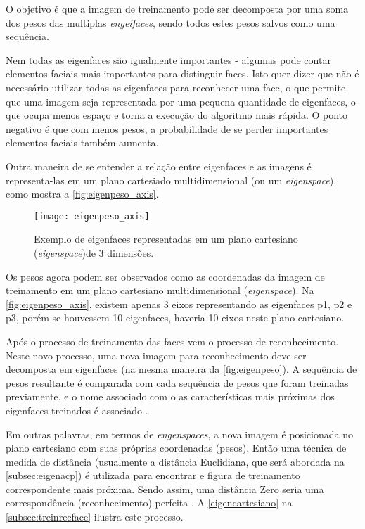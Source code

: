 O objetivo é que a imagem de treinamento pode ser decomposta por uma soma dos pesos das multiplas \textit{engeifaces}, sendo todos estes pesos salvos como uma sequência.

Nem todas as eigenfaces são igualmente importantes - algumas pode contar elementos faciais mais importantes para distinguir faces. Isto quer dizer que não é necessário utilizar todas as eigenfaces para reconhecer uma face, o que permite que uma imagem seja representada por uma pequena quantidade de eigenfaces, o que ocupa menos espaço e torna a execução do algoritmo mais rápida. O ponto negativo é que com menos pesos, a probabilidade de se perder importantes elementos faciais também aumenta\cite{drmathew_java_programming}.

Outra maneira de se entender a relação entre eigenfaces e as imagens é representa-las em um plano cartesiado multidimensional (ou um \textit{eigenspace}), como mostra a \autoref{fig:eigenpeso_axis}.

\begin{figure}[h]
	\centering
	\texttt{[image: eigenpeso\_axis]}
	\caption{Exemplo de eigenfaces representadas em um plano cartesiano (\textit{eigenspace})de 3 dimensões. }
	\label{fig:eigenpeso_axis}
\end{figure}

Os pesos agora podem ser observados como as coordenadas da imagem de treinamento em um plano cartesiano multidimensional (\textit{eigenspace}). Na \autoref{fig:eigenpeso_axis}, existem apenas 3 eixos representando as eigenfaces p1, p2 e p3, porém se houvessem 10 eigenfaces, haveria 10 eixos neste plano cartesiano.

Após o processo de treinamento das faces vem o processo de reconhecimento. Neste novo processo, uma nova imagem para reconhecimento deve ser decomposta em eigenfaces (na mesma maneira da \autoref{fig:eigenpeso}). A sequência de pesos resultante é comparada com cada sequência de pesos que foram treinadas previamente, e o nome associado com o as características mais próximas dos eigenfaces treinados é associado \cite{drmathew_java_programming}.

Em outras palavras, em termos de \textit{engenspaces}, a nova imagem é posicionada no plano cartesiano com suas próprias coordenadas (pesos). Então uma técnica de medida de distância (usualmente a distância Euclidiana, que será abordada na \autoref{subsec:eigenacp}) é utilizada para encontrar e figura de treinamento correspondente mais próxima. Sendo assim, uma distância Zero seria uma correspondência (reconhecimento) perfeita \cite{drmathew_java_programming}. A \autoref{eigencartesiano} na \autoref{subsec:treinrecface} ilustra este processo.

